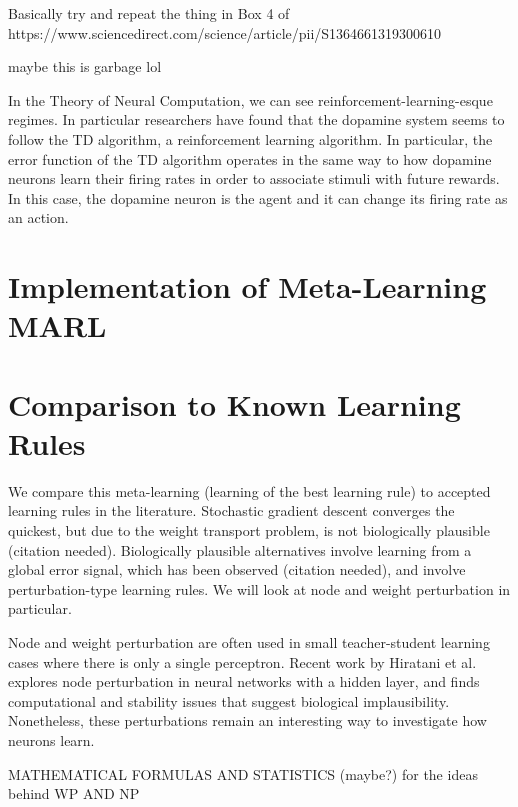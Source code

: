 \documentclass[11pt,letterpaper]{article}
\begin{document}
Basically try and repeat the thing in Box 4 of https://www.sciencedirect.com/science/article/pii/S1364661319300610




maybe this is garbage lol

In the Theory of Neural Computation, we can see reinforcement-learning-esque
regimes. In particular researchers have found that the dopamine system seems
to follow the TD algorithm, a reinforcement learning algorithm. In particular, the error
function of the TD algorithm operates in the same way to how dopamine neurons learn their firing rates in order to 
associate stimuli with future rewards. In this case, the dopamine neuron is the agent
and it can change its firing rate as an action. 





\section{Implementation of Meta-Learning MARL}



\section{Comparison to Known Learning Rules}

We compare this meta-learning (learning of the best learning rule) to accepted learning rules in the literature. Stochastic gradient descent converges the quickest, but due to the weight transport problem, is not biologically plausible (citation needed). Biologically plausible alternatives involve learning from a global error signal, which has been observed (citation needed), and involve perturbation-type learning rules. We will look at node and weight perturbation in particular. 

Node and weight perturbation are often used in small teacher-student learning cases 
where there is only a single perceptron. Recent work by Hiratani et al. explores node perturbation
in neural networks with a hidden layer, and finds computational and stability issues that
suggest biological implausibility. Nonetheless, these perturbations remain an interesting way
to investigate how neurons learn.

MATHEMATICAL FORMULAS AND STATISTICS (maybe?) for the ideas behind WP AND NP
\end{document}
